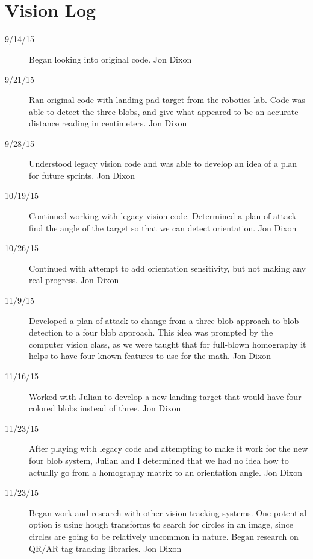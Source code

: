 \section{Vision Log}

\begin{description}

\item [9/14/15]  Began looking into original code. \hfill{Jon Dixon}

\item [9/21/15]  Ran original code with landing pad target from the robotics lab. Code was able to detect the three blobs, and give what appeared to be an accurate distance reading in centimeters. \hfill{Jon Dixon}

\item [9/28/15]  Understood legacy vision code and was able to develop an idea of a plan for future sprints. \hfill{Jon Dixon}

\item [10/19/15]  Continued working with legacy vision code. Determined a plan of attack - find the angle of the target so that we can detect orientation. \hfill{Jon Dixon}

\item [10/26/15]  Continued with attempt to add orientation sensitivity, but not making any real progress. \hfill{Jon Dixon}

\item [11/9/15]  Developed a plan of attack to change from a three blob approach to blob detection to a four blob approach. This idea was prompted by the computer vision class, as we were taught that for full-blown homography it helps to have four known features to use for the math. \hfill{Jon Dixon}

\item [11/16/15]  Worked with Julian to develop a new landing target that would have four colored blobs instead of three. \hfill{Jon Dixon}

\item [11/23/15]  After playing with legacy code and attempting to make it work for the new four blob system, Julian and I determined that we had no idea how to actually go from a homography matrix to an orientation angle. \hfill{Jon Dixon}

\item[11/23/15] Began work and research with other vision tracking systems. One potential option is using hough transforms to search for circles in an image, since circles are going to be relatively uncommon in nature. Began research on QR/AR tag tracking libraries. \hfill{Jon Dixon}


\end{description}
